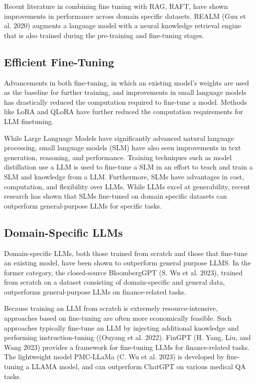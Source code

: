 Recent literature in combining fine tuning with RAG, RAFT, have shown
improvements in performance across domain specific datasets. REALM (Guu et al.
2020) augments a language model with a neural knowledge retrieval engine that is
also trained during the pre-training and fine-tuning stages.

\subsection{Efficient Fine-Tuning}

Advancements in both fine-tuning, in which an existing model’s weights are used as the baseline for further training, and improvements in small language models has drastically reduced the computation required to fine-tune a model. Methods like LoRA and QLoRA have further reduced the computation requirements for LLM finetuning.

While Large Language Models have significantly advanced natural language processing, small language models (SLM) have also seen improvements in text generation, reasoning, and performance. Training techniques such as model distillation use a LLM is used to fine-tune a SLM in an effort to teach and train a SLM and knowledge from a LLM. Furthermore, SLMs have advantages in cost, computation, and flexibility over LLMs. While LLMs excel at generability, recent research has shown that SLMs fine-tuned on domain specific datasets can outperform general-purpose LLMs for specific tasks.

\subsection{Domain-Specific LLMs}

Domain-specific LLMs, both those trained from scratch and those that fine-tune
an existing model, have been shown to outperform general purpose LLMS. In the
former category, the closed-source BloombergGPT (S. Wu et al. 2023), trained
from scratch on a dataset consisting of domain-specific and general data,
outperforms general-purpose LLMs on finance-related tasks.

Because training an LLM from scratch is extremely resource-intensive, approaches
based on fine-tuning are often more economically feasible. Such approaches
typically fine-tune an LLM by injecting additional knowledge and performing
instruction-tuning ((Ouyang et al. 2022). FinGPT (H. Yang, Liu, and Wang 2023)
provides a framework for fine-tuning LLMs for finance-related tasks. The
lightweight model PMC-LLaMa (C. Wu et al. 2023) is developed by fine-tuning a
LLAMA model, and can outperform ChatGPT on various medical QA tasks.
